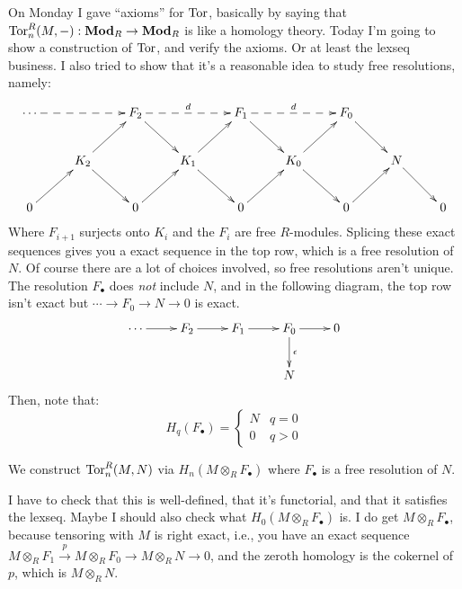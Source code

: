 On Monday I gave ``axioms'' for $\operatorname{Tor}$, basically by saying that $\operatorname{Tor}^R_n(M,-):\mathbf{Mod}_R\to\mathbf{Mod}_R$ is like a homology theory. Today I'm going to show a construction of $\operatorname{Tor}$, and verify the axioms. Or at least the lexseq business. I also tried to show that it's a reasonable idea to study free resolutions, namely:
\begin{equation*}
\xymatrix{\cdots\ar@{-->}[rr] & & F_2\ar[dr]\ar@{-->}[rr]^d & & F_1\ar[dr]\ar@{-->}[rr]^d & & F_0\ar[dr]\\
& K_2\ar[ur]\ar[dr] & & K_1\ar[ur]\ar[dr] & & K_0\ar[ur]\ar[dr] & & N\ar[dr]\\
0\ar[ur] & & 0\ar[ur] & & 0\ar[ur] & & 0\ar[ur] & & 0}
\end{equation*}
Where $F_{i+1}$ surjects onto $K_i$ and the $F_i$ are free $R$-modules. Splicing these exact sequences gives you a exact sequence in the top row, which is a free resolution of $N$. Of course there are a lot of choices involved, so free resolutions aren't unique. The resolution $F_\bullet$ does \emph{not} include $N$, and in the following diagram, the top row isn't exact but $\cdots\to F_0\to N\to 0$ is exact.
\begin{equation*}
\xymatrix{\cdots\ar[r] & F_2\ar[r] & F_1\ar[r] & F_0\ar[r]\ar[d]^\epsilon & 0\\
 & & & N & }
\end{equation*}
Then, note that:
\begin{equation*}
 H_q(F_\bullet)=\begin{cases}
N & q=0\\
0 & q>0
\end{cases}
\end{equation*}
\begin{construction}
We construct $\operatorname{Tor}^R_n(M,N)$ via $ H_n(M\otimes_R F_\bullet)$ where $F_\bullet$ is a free resolution of $N$.
\end{construction}
I have to check that this is well-defined, that it's functorial, and that it satisfies the lexseq. Maybe I should also check what $ H_0(M\otimes_R F_\bullet)$ is. I do get $M\otimes_R F_\bullet$, because tensoring with $M$ is right exact, i.e., you have an exact sequence $M\otimes_R F_1\xrightarrow{p} M\otimes_R F_0\to M\otimes_R N\to 0$, and the zeroth homology is the cokernel of $p$, which is $M\otimes_R N$.


